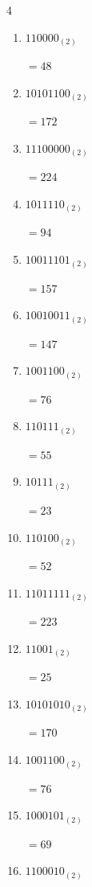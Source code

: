 \begin{multicols}{4}
\begin{enumerate}
        $=42$

  \item $110000_{(2)}$

        $=48$

  \item $10101100_{(2)}$

        $=172$

  \item $11100000_{(2)}$

        $=224$

  \item $1011110_{(2)}$

        $=94$

  \item $10011101_{(2)}$

        $=157$

  \item $10010011_{(2)}$

        $=147$

  \item $1001100_{(2)}$

        $=76$

\columnbreak %

  \item $110111_{(2)}$

        $=55$

  \item $10111_{(2)}$

        $=23$

  \item $110100_{(2)}$

        $=52$

  \item $11011111_{(2)}$

        $=223$

  \item $11001_{(2)}$

        $=25$

  \item $10101010_{(2)}$

        $=170$

  \item $1001100_{(2)}$

        $=76$

  \item $1000101_{(2)}$

        $=69$

  \item $1100010_{(2)}$


\end{enumerate}
\end{multicols}
